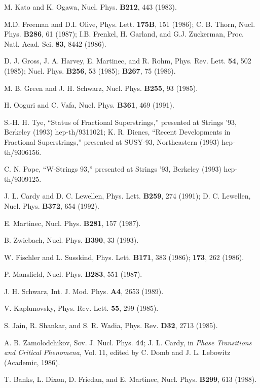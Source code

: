 \begin{thebibliography}{99}
 M. Kato and K. Ogawa, Nucl. Phys. {\bf B212}, 443
(1983).

 M.D. Freeman and D.I. Olive,
Phys. Lett. {\bf 175B}, 151 (1986);  
C. B. Thorn, Nucl. Phys. {\bf B286}, 61 (1987);  
I.B. Frenkel, H. Garland, and G.J. Zuckerman,
Proc. Natl. Acad. Sci. {\bf 83}, 8442 (1986).  

 D. J. Gross, J. A. Harvey, E. Martinec, and R. Rohm,
Phys. Rev. Lett. {\bf 54}, 502 (1985); Nucl. Phys. {\bf B256}, 53
(1985); {\bf B267}, 75 (1986).

 M. B. Green and J. H. Schwarz, Nucl. Phys. {\bf
B255}, 93 (1985).

 H. Ooguri and C. Vafa, Nucl. Phys.
{\bf B361}, 469 (1991).  

 S.-H. H. Tye, ``Status of Fractional Superstrings,''
 presented at Strings '93, Berkeley (1993) hep-th/9311021;
K. R. Dienes, ``Recent Developments in Fractional
Superstrings,''
presented at SUSY-93, Northeastern (1993) hep-th/9306156.

 C. N. Pope, ``W-Strings 93,'' presented at Strings
'93, Berkeley (1993) hep-th/9309125.

 J. L. Cardy and D. C. Lewellen, Phys. Lett. {\bf
B259}, 274 (1991);
D. C. Lewellen, Nucl. Phys. {\bf B372}, 654 (1992).

 E. Martinec, Nucl. Phys. {\bf B281}, 157 (1987).

 B. Zwiebach, Nucl. Phys. {\bf B390}, 33 (1993).

 W. Fischler and L. Susskind, Phys. Lett. {\bf B171},
383 (1986); {\bf 173}, 262 (1986).

 P. Mansfield, Nucl. Phys. {\bf B283}, 551 (1987).

 J. H. Schwarz, Int. J. Mod. Phys.
{\bf A4}, 2653 (1989).  

 V. Kaplunovsky, Phys. Rev. Lett. {\bf 55}, 299
(1985).

 S. Jain, R. Shankar, and S. R. Wadia,
Phys. Rev. {\bf D32}, 2713 (1985).  

 A. B. Zamolodchikov, Sov. J. Nucl. Phys. {\bf 44};
J. L. Cardy, in {\it Phase Transitions and Critical
Phenomena,} Vol. 11, edited by C. Domb and J. L. Lebowitz
(Academic, 1986).

 T. Banks, L. Dixon, D. Friedan, and E. Martinec,
Nucl. Phys. {\bf B299}, 613 (1988).


\end{thebibliography}
